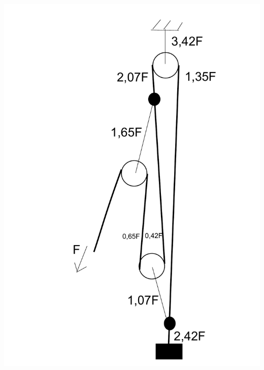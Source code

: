 \documentclass[11pt]{article}
\begin{document}
\begin{center}
\includegraphics[scale=0.25]{2014-v3g-06-PolyspastL2}
\end{center}
\probend
\bigskip

\end{document}
